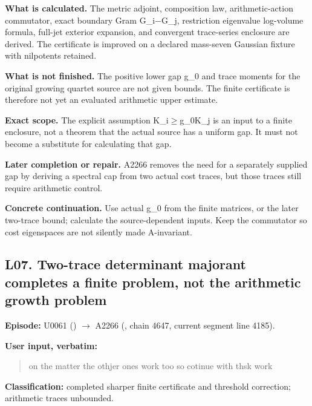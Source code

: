 \textbf{What is calculated.} The metric adjoint, composition law,
arithmetic-action commutator, exact boundary Gram
G\_i\allowbreak{}\ensuremath{−}\allowbreak{}G\_j, restriction eigenvalue
log-volume formula, full-jet exterior expansion, and convergent
trace-series enclosure are derived. The certificate is improved on a
declared mass-seven Gaussian fixture with nilpotents retained.

\textbf{What is not finished.} The positive lower gap g\_0 and trace
moments for the original growing quartet source are not given bounds.
The finite certificate is therefore not yet an evaluated arithmetic
upper estimate.

\textbf{Exact scope.} The explicit assumption
K\_i\allowbreak{}\ensuremath{≥}\allowbreak{}g\_0K\_j is an input to a
finite enclosure, not a theorem that the actual source has a uniform
gap. It must not become a substitute for calculating that gap.

\textbf{Later completion or repair.} A2266 removes the need for a
separately supplied gap by deriving a spectral cap from two actual cost
traces, but those traces still require arithmetic control.

\textbf{Concrete continuation.} Use actual g\_0 from the finite
matrices, or the later two-trace bound; calculate the source-dependent
inputs. Keep the commutator so cost eigenspaces are not silently made
A-invariant.

\subsection{L07. Two-trace determinant majorant completes a finite
problem, not the arithmetic growth
problem}\label{TranscriptLedgerStage:l07.-two-trace-determinant-majorant-completes-a-finite-problem-not-the-arithmetic-growth-problem}

\textbf{Episode:} U0061
(\protect{})
\allowbreak{}\ensuremath{→}\allowbreak{} A2266
(\protect{}, chain 4647,
current segment line 4185).

\textbf{User input, verbatim:}

\begin{quote}
on the matter the othjer ones work too so cotinue with thsk work
\end{quote}

\textbf{Classification:} completed sharper finite certificate and
threshold correction; arithmetic traces unbounded.

